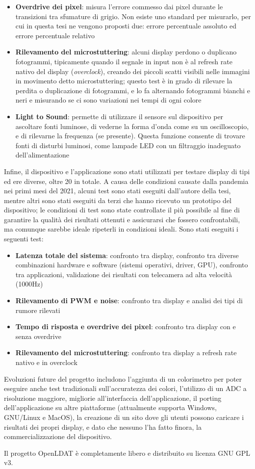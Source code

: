 \documentclass[a4paper]{article}
\begin{document}
\begin{itemize}
	\item \textbf{Overdrive dei pixel}: misura l'errore commesso dai pixel durante le transizioni tra sfumature di grigio. Non esiste uno standard per misurarlo, per cui in questa tesi ne vengono proposti due: errore percentuale assoluto ed errore percentuale relativo
	\item \textbf{Rilevamento del microstuttering}: alcuni display perdono o duplicano fotogrammi, tipicamente quando il segnale in input non è al refresh rate nativo del display (\textit{overclock}), creando dei piccoli scatti visibili nelle immagini in movimento detto microstuttering; questo test è in grado di rilevare la perdita o duplicazione di fotogrammi, e lo fa alternando fotogrammi bianchi e neri e misurando se ci sono variazioni nei tempi di ogni colore
	\item \textbf{Light to Sound}: permette di utilizzare il sensore sul dispositivo per ascoltare fonti luminose, di vederne la forma d'onda come su un oscilloscopio, e di rilevarne la frequenza (se presente). Questa funzione consente di trovare fonti di disturbi luminosi, come lampade LED con un filtraggio inadeguato dell'alimentazione
\end{itemize}

Infine, il dispositivo e l'applicazione sono stati utilizzati per testare display di tipi ed ere diverse, oltre 20 in totale. A causa delle condizioni causate dalla pandemia nei primi mesi del 2021, alcuni test sono stati eseguiti dall'autore della tesi, mentre altri sono stati eseguiti da terzi che hanno ricevuto un prototipo del dispositivo; le condizioni di test sono state controllate il più possibile al fine di garantire la qualità dei risultati ottenuti e assicurarsi che fossero confrontabili, ma comunque sarebbe ideale ripeterli in condizioni ideali. Sono stati eseguiti i seguenti test:\begin{itemize}
	\item \textbf{Latenza totale del sistema}: confronto tra display, confronto tra diverse combinazioni hardware e software (sistemi operativi, driver, GPU), confronto tra applicazioni, validazione dei risultati con telecamera ad alta velocità (1000Hz)
	\item \textbf{Rilevamento di PWM e noise}: confronto tra display e analisi dei tipi di rumore rilevati
	\item \textbf{Tempo di risposta e overdrive dei pixel}: confronto tra display con e senza overdrive
	\item \textbf{Rilevamento del microstuttering}: confronto tra display a refresh rate nativo e in overclock
\end{itemize}

Evoluzioni future del progetto includono l'aggiunta di un colorimetro per poter eseguire anche test tradizionali sull'accuratezza dei colori, l'utilizzo di un ADC a risoluzione maggiore, migliorie all'interfaccia dell'applicazione, il porting dell'applicazione su altre piattaforme (attualmente supporta Windows, GNU/Linux e MacOS), la creazione di un sito dove gli utenti possono caricare i risultati dei propri display, e dato che nessuno l'ha fatto finora, la commercializzazione del dispositivo.

Il progetto OpenLDAT è completamente libero e distribuito su licenza GNU GPL v3.
\end{document}
